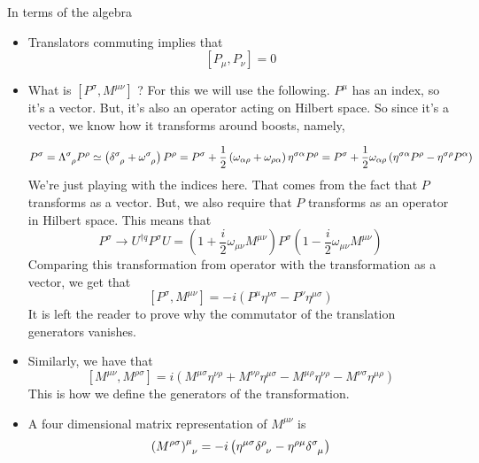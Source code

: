 \documentclass[11pt, oneside]{article}   	%
\theoremstyle{slanted}
\begin{document}
In terms of the algebra
\begin{itemize}
	\item  Translators commuting implies that 
		\[
		 \left[ P _ \mu , P _ \nu  \right]  = 0
		\]  
	\item What is $ \left[  P ^ \sigma , M ^{ \mu \nu }  \right]  $ ? 
		For this we will use the following. 
		$ P  ^ \mu $ has an index, so it's a vector. 
		But, it's also an operator acting on 
		Hilbert space. So since it's a vector, 
		we know how it transforms around boosts, namely, 

		\[
		 P ^ \sigma = \Lambda \indices{ ^ \sigma _ \rho } P ^ \rho  
		 \simeq \left( \delta \indices{ ^ \sigma _ \rho } + 
		 \omega \indices{ ^ \sigma _ \rho }  \right)  P ^ \rho  = 
		 P ^ \sigma + \frac{1}{ 2 } \left( \omega _{ 
		 \alpha \rho } + \omega _{ \rho \alpha }  \right)  \eta ^{ \sigma \alpha } 
		 P ^{ \rho }  = 
		 P ^{ \sigma } + \frac{1}{2 } \omega _{ \alpha \rho } 
		 \left( \eta ^{ \sigma \alpha } P ^ \rho  - \eta ^{ \sigma \rho } P ^ \alpha  \right) 
		\]  We're just playing with 
		the indices here. That comes from the fact that 
		$ P $ transforms as a vector. 
		But, we also require that $ P $ transforms as an operator
		in Hilbert space. This means that 
		\[
		 P ^ \sigma \to U^{ \dagger q} P ^ \sigma U  = 
		 \left( 1  + \frac{i}{2 } \omega _{ \mu \nu } M ^{ \mu \nu  }  \right)  
		 P ^ \sigma \left(  1 - \frac{i}{2 } \omega _{ \mu \nu } M ^{ \mu \nu }  \right) 
		\] Comparing 
		this transformation from operator 
		with the transformation as a vector, 
		we get that 
		\[
		 \left[  P ^ \sigma , M ^{ \mu \nu }  \right]   = 
		  -i \left( P ^ \mu \eta ^{ \nu \sigma }  - P ^ \nu \eta ^{ \mu \sigma } \right) 
		\] It is left the reader to prove why the commutator
		of the translation generators vanishes. 
	\item Similarly, we have that 
		\[
		 \left[  M ^{ \mu \nu } , M ^{ \rho \sigma }  \right]   = 
		 i \left( M ^{ \mu \sigma } \eta ^{ \nu \rho } + 
		 M ^{ \nu \rho } \eta ^{ \mu \sigma } - 
	 M ^{ \mu \rho } \eta ^{ \nu \rho }  - M ^{ \nu \sigma } \eta ^{ \mu \rho } \right)  
		\] This is how we define 
		the generators of the transformation. 
	\item A four dimensional matrix representation of $ M ^{ \mu \nu } $ 
		is 
		\[
		 \left( M^{ \rho \sigma }   \right)\indices{ ^ \mu _ \nu } 
		  = - i \left( \eta ^{ \mu \sigma } \delta \indices{ ^ \rho _ \nu } 
		   - \eta ^{ \rho \mu } \delta \indices{ ^ \sigma _ \mu }  \right) 
		\] 
\end{itemize}
\end{document}
